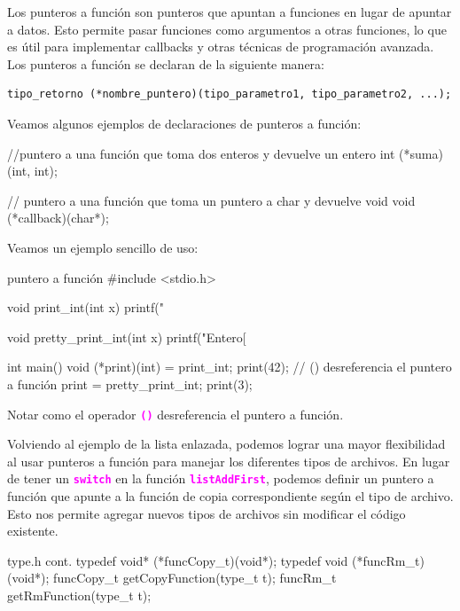 \documentclass[]{scrartcl}
\newcommand{\hl}[1]{\textcolor{magenta}{\textbf{\texttt{#1}}}}
\begin{document}
Los punteros a función son punteros que apuntan a funciones en lugar de apuntar a datos. Esto permite pasar funciones como argumentos a otras funciones, lo que es útil para implementar callbacks y otras técnicas de programación avanzada.
Los punteros a función se declaran de la siguiente manera:

\begin{center}
  \begin{Verbatim}[fontshape=it]
    tipo_retorno (*nombre_puntero)(tipo_parametro1, tipo_parametro2, ...);
  \end{Verbatim}
\end{center}

Veamos algunos ejemplos de declaraciones de punteros a función: 

\begin{cbox}[]{}
  //puntero a una función que toma dos enteros y devuelve un entero
  int (*suma)(int, int);

  // puntero a una función que toma un puntero a char y devuelve void
  void (*callback)(char*);

\end{cbox}

Veamos un ejemplo sencillo de uso:

\begin{cbox}[]{puntero a función}
  #include <stdio.h>

  void print_int(int x) {
      printf("%
  }
  
  void pretty_print_int(int x) {
      printf("Entero[%
  }
  
  int main() {
      void (*print)(int) = print_int;
      print(42);  // () desreferencia el puntero a función
      print = pretty_print_int;
      print(3);
  }
\end{cbox}

Notar como el operador \hl{()} desreferencia el puntero a función. 

Volviendo al ejemplo de la lista enlazada, podemos lograr una mayor flexibilidad al usar punteros a función para manejar los diferentes tipos de archivos. En lugar de tener un \hl{switch} en la función \hl{listAddFirst}, podemos definir un puntero a función que apunte a la función de copia correspondiente según el tipo de archivo. Esto nos permite agregar nuevos tipos de archivos sin modificar el código existente.

\begin{cbox}[]{type.h cont.}
  typedef void* (*funcCopy_t)(void*);
  typedef void (*funcRm_t)(void*);
  funcCopy_t getCopyFunction(type_t t);
  funcRm_t getRmFunction(type_t t);
\end{cbox}
\end{document}
